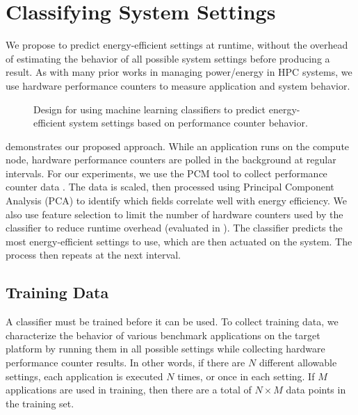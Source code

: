 \section{Classifying System Settings}
\label{sec:classifiers-framework}

We propose to predict energy-efficient settings at runtime, without the overhead of estimating the behavior of all possible system settings before producing a result.
As with many prior works in managing power/energy in HPC systems, we use hardware performance counters to measure application and system behavior.

\begin{figure}[t]
  \begin{centering}
    
    \caption{Design for using machine learning classifiers to predict energy-efficient system settings based on performance counter behavior.}
    \label{fig:classifier-runtime}
  \end{centering}
\end{figure}

 demonstrates our proposed approach.
While an application runs on the compute node, hardware performance counters are polled in the background at regular intervals.
For our experiments, we use the PCM tool to collect performance counter data \cite{PCMGit}.
The data is scaled, then processed using Principal Component Analysis (PCA) to identify which fields correlate well with energy efficiency.
We also use feature selection to limit the number of hardware counters used by the classifier to reduce runtime overhead (evaluated in ).
The classifier predicts the most energy-efficient settings to use, which are then actuated on the system.
The process then repeats at the next interval.


\subsection{Training Data}


A classifier must be trained before it can be used.
To collect training data, we characterize the behavior of various benchmark applications on the target platform by running them in all possible settings while collecting hardware performance counter results.
In other words, if there are $N$ different allowable settings, each application is executed $N$ times, or once in each setting.
If $M$ applications are used in training, then there are a total of $N \times M$ data points in the training set.

